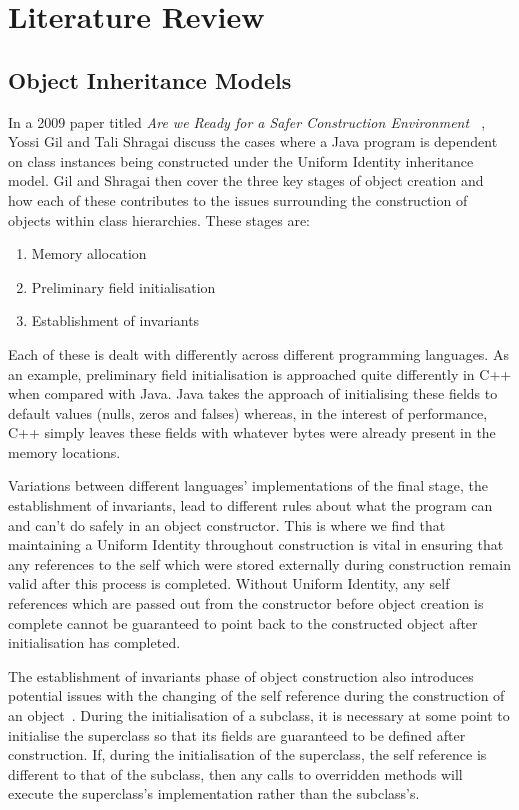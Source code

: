 \chapter{Literature Review}\label{C:us}
\section{Object Inheritance Models}
\label{inheritanceModels}
In a 2009 paper titled \textit{Are we Ready for a Safer Construction Environment ~\cite{SaferConstruction}}, Yossi Gil and Tali Shragai discuss the cases where a Java program is dependent on class instances being constructed under the Uniform Identity inheritance model. Gil and Shragai then cover the three key stages of object creation and how each of these contributes to the issues surrounding the construction of objects within class hierarchies. These stages are:
\begin{enumerate}
	\item Memory allocation
	\item Preliminary field initialisation
	\item Establishment of invariants
\end{enumerate}
Each of these is dealt with differently across different programming languages. As an example, preliminary field initialisation is approached quite differently in C++ when compared with Java. Java takes the approach of initialising these fields to default values (nulls, zeros and falses) whereas, in the interest of performance, C++ simply leaves these fields with whatever bytes were already present in the memory locations.

Variations between different languages’ implementations of the final stage, the establishment of invariants, lead to different rules about what the program can and can't do safely in an object constructor. This is where we find that maintaining a Uniform Identity throughout construction is vital in ensuring that any references to the self which were stored externally during construction remain valid after this process is completed. Without Uniform Identity, any self references which are passed out from the constructor before object creation is complete cannot be guaranteed to point back to the constructed object after initialisation has completed.
\newline

The establishment of invariants phase of object construction also introduces potential issues with the changing of the self reference during the construction of an object~\cite{SaferConstruction}. During the initialisation of a subclass, it is necessary at some point to initialise the superclass so that its fields are guaranteed to be defined after construction. If, during the initialisation of the superclass, the self reference is different to that of the subclass, then any calls to overridden methods will execute the superclass's implementation rather than the subclass's.

